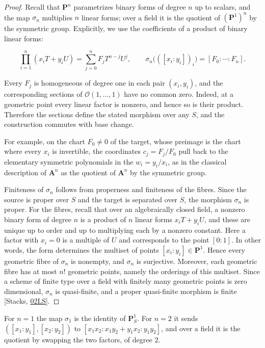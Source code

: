 \documentclass[11pt]{article}
\begin{document}
\begin{proof}[{Proof}]\label{bp89}%
Recall that \(\mathbf P^n\) parametrizes binary forms of degree \(n\) up to scalars, and the map \(\sigma_n\) multiplies \(n\) linear forms; over a field it is the quotient of \((\mathbf P^1)^n\) by the symmetric group. Explicitly, we use the coefficients of a product of binary linear forms:

\[
\prod_{i=1}^n(x_iT+y_iU)
=\sum_{j=0}^nF_jT^{n-j}U^j,\qquad
\sigma_n\bigl(([x_i:y_i])_i\bigr)=[F_0:\cdots:F_n].
\]

Every \(F_j\) is homogeneous of degree one in each pair \((x_i,y_i)\), and the corresponding sections of \(\mathcal O(1,\ldots,1)\) have no common zero. Indeed, at a geometric point every linear factor is nonzero, and hence so is their product. Therefore the sections define the stated morphism over any \(S\), and the construction commutes with base change.

For example, on the chart \(F_0\ne0\) of the target, whose preimage is the chart where every \(x_i\) is invertible, the coordinates \(c_j=F_j/F_0\) pull back to the elementary symmetric polynomials in the \(w_i=y_i/x_i\), as in the classical description of \(\mathbf A^n\) as the quotient of \(\mathbf A^n\) by the symmetric group.

Finiteness of \(\sigma_n\) follows from properness and finiteness of the fibres. Since the source is proper over \(S\) and the target is separated over \(S\), the morphism \(\sigma_n\) is proper. For the fibres, recall that over an algebraically closed field, a nonzero binary form of degree \(n\) is a product of \(n\) linear forms \(x_iT+y_iU\), and these are unique up to order and up to multiplying each by a nonzero constant. Here a factor with \(x_i=0\) is a multiple of \(U\) and corresponds to the point \([0:1]\). In other words, the form determines the multiset of points \([x_i:y_i]\in\mathbf P^1\). Hence every geometric fibre of \(\sigma_n\) is nonempty, and \(\sigma_n\) is surjective. Moreover, each geometric fibre has at most \(n!\) geometric points, namely the orderings of this multiset. Since a scheme of finite type over a field with finitely many geometric points is zero dimensional, \(\sigma_n\) is quasi-finite, and a proper quasi-finite morphism is finite [Stacks, \href{https://stacks.math.columbia.edu/tag/02LS}{02LS}].
\end{proof}

\label{bp90}%
For \(n=1\) the map \(\sigma_1\) is the identity of \(\mathbf P^1_S\). For \(n=2\) it sends \(([x_1:y_1],[x_2:y_2])\) to \([x_1x_2:x_1y_2+y_1x_2:y_1y_2]\), and over a field it is the quotient by swapping the two factors, of degree \(2\).
\end{document}
